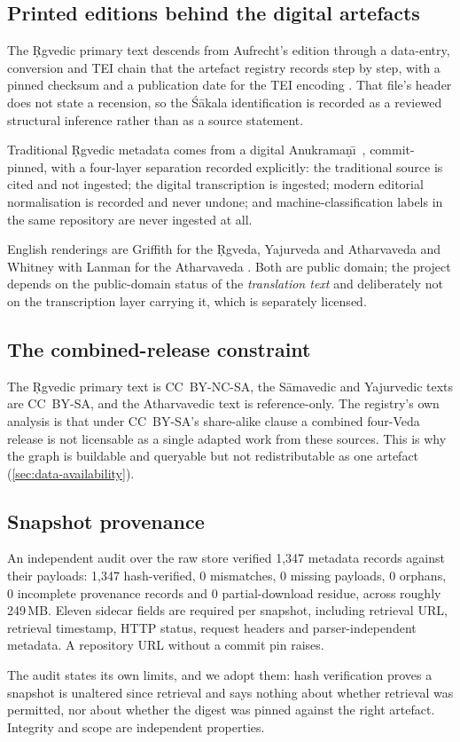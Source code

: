 \subsection{Printed editions behind the digital artefacts}

The \d{R}gvedic primary text descends from Aufrecht's edition
\citep{aufrecht1877rigveda} through a data-entry, conversion and \mbox{TEI} chain
that the artefact registry records step by step, with a pinned checksum and a
publication date for the \mbox{TEI} encoding \citep{gretil}. That file's header does
not state a recension, so the \'S\=akala identification is recorded as a reviewed
structural inference rather than as a source statement.

Traditional \d{R}gvedic metadata comes from a digital Anukrama\d{n}\=\i\
\citep{akavarapu2023anukramani}, commit-pinned, with a four-layer separation recorded
explicitly: the traditional source is cited and not ingested; the digital
transcription is ingested; modern editorial normalisation is recorded and never
undone; and machine-classification labels in the same repository are never ingested
at all.

English renderings are Griffith for the \d{R}gveda, Yajurveda and Atharvaveda
\citep{griffith1896rigveda,griffith1899yajurveda,griffith1895atharvaveda} and Whitney
with Lanman for the Atharvaveda \citep{whitney1905atharva}. Both are public domain;
the project depends on the public-domain status of the \emph{translation text} and
deliberately not on the transcription layer carrying it, which is separately
licensed.

\subsection{The combined-release constraint}

The \d{R}gvedic primary text is CC~BY-NC-SA, the S\=amavedic and Yajurvedic texts are
CC~BY-SA, and the Atharvavedic text is reference-only. The registry's own analysis is
that under CC~BY-SA's share-alike clause a combined four-Veda release is not
licensable as a single adapted work from these sources. This is why the graph is
buildable and queryable but not redistributable as one artefact
(\cref{sec:data-availability}).

\subsection{Snapshot provenance}

An independent audit over the raw store verified 1{,}347 metadata records against
their payloads: 1{,}347 hash-verified, 0 mismatches, 0 missing payloads, 0 orphans,
0 incomplete provenance records and 0 partial-download residue, across roughly
249\,MB. Eleven sidecar fields are required per snapshot, including retrieval URL,
retrieval timestamp, HTTP status, request headers and parser-independent metadata.
A repository URL without a commit pin raises.

The audit states its own limits, and we adopt them: hash verification proves a
snapshot is unaltered since retrieval and says nothing about whether retrieval was
permitted, nor about whether the digest was pinned against the right artefact.
Integrity and scope are independent properties.
